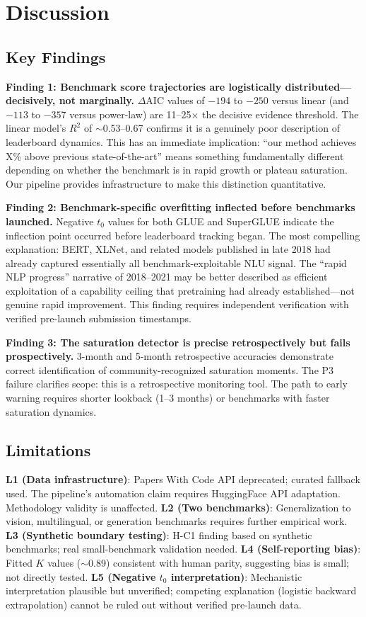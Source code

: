 \section{Discussion}

\subsection{Key Findings}

\textbf{Finding 1: Benchmark score trajectories are logistically distributed---decisively, not marginally.}
$\Delta$AIC values of $-194$ to $-250$ versus linear (and $-113$ to $-357$ versus power-law) are 11--25$\times$ the decisive evidence threshold.
The linear model's $R^2$ of $\sim$0.53--0.67 confirms it is a genuinely poor description of leaderboard dynamics.
This has an immediate implication: ``our method achieves X\% above previous state-of-the-art'' means something fundamentally different depending on whether the benchmark is in rapid growth or plateau saturation.
Our pipeline provides infrastructure to make this distinction quantitative.

\textbf{Finding 2: Benchmark-specific overfitting inflected before benchmarks launched.}
Negative $t_0$ values for both GLUE and SuperGLUE indicate the inflection point occurred before leaderboard tracking began.
The most compelling explanation: BERT, XLNet, and related models published in late 2018 had already captured essentially all benchmark-exploitable NLU signal.
The ``rapid NLP progress'' narrative of 2018--2021 may be better described as efficient exploitation of a capability ceiling that pretraining had already established---not genuine rapid improvement.
This finding requires independent verification with verified pre-launch submission timestamps.

\textbf{Finding 3: The saturation detector is precise retrospectively but fails prospectively.}
3-month and 5-month retrospective accuracies demonstrate correct identification of community-recognized saturation moments.
The P3 failure clarifies scope: this is a retrospective monitoring tool.
The path to early warning requires shorter lookback (1--3 months) or benchmarks with faster saturation dynamics.

\subsection{Limitations}

\textbf{L1 (Data infrastructure)}: Papers With Code API deprecated; curated fallback used.
The pipeline's automation claim requires HuggingFace API adaptation.
Methodology validity is unaffected.
\textbf{L2 (Two benchmarks)}: Generalization to vision, multilingual, or generation benchmarks requires further empirical work.
\textbf{L3 (Synthetic boundary testing)}: H-C1 finding based on synthetic benchmarks; real small-benchmark validation needed.
\textbf{L4 (Self-reporting bias)}: Fitted $K$ values ($\sim$0.89) consistent with human parity, suggesting bias is small; not directly tested.
\textbf{L5 (Negative $t_0$ interpretation)}: Mechanistic interpretation plausible but unverified; competing explanation (logistic backward extrapolation) cannot be ruled out without verified pre-launch data.

